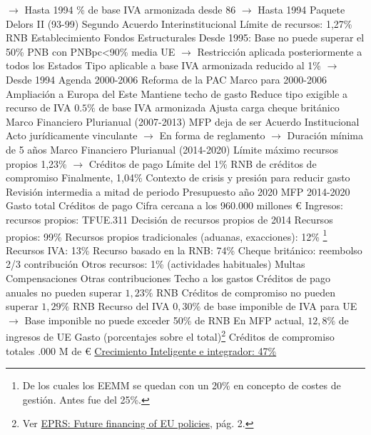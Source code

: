 \documentclass{nuevotema}
\begin{document}
\begin{esquemal}
				\4[] $\to$ Hasta 1994
				\% de base IVA armonizada  desde 86
				\4[] $\to$ Hasta 1994
			\3 Paquete Delors II (93-99)
				\4 Segundo Acuerdo Interinstitucional
				\4 Límite de recursos: 1,27\% RNB
				\4 Establecimiento Fondos Estructurales
				\4 Desde 1995:
				\4[] Base no puede superar el 50\% PNB con PNBpc<90\% media UE
				\4[] $\to$ Restricción aplicada posteriormente a todos los Estados
				\4[] Tipo aplicable a base IVA armonizada reducido al 1\%
				\4[] $\to$ Desde 1994
			\3 Agenda 2000-2006
				\4 Reforma de la PAC
				\4 Marco para 2000-2006
				\4 Ampliación a Europa del Este
				\4 Mantiene techo de gasto
				\4 Reduce tipo exigible a recurso de IVA
				\4[] $0.5\%$ de base IVA armonizada
				\4 Ajusta carga cheque británico
			\3 Marco Financiero Plurianual (2007-2013)
				\4 MFP deja de ser Acuerdo Institucional
				\4[] Acto jurídicamente vinculante
				\4[] $\to$ En forma de reglamento
				\4[] $\to$ Duración mínima de 5 años
			\3 Marco Financiero Plurianual (2014-2020)
				\4 Límite máximo recursos propios 1,23\%
				\4[] $\to$ Créditos de pago
				\4 Límite del 1\% RNB de créditos de compromiso
				\4[] Finalmente, 1,04\%
				\4 Contexto de crisis y presión para reducir gasto
				\4 Revisión intermedia a mitad de periodo
			\3 Presupuesto año 2020
		\2 MFP 2014-2020
			\3 Gasto total
				\4 Créditos de pago
				\4 Cifra cercana a los 960.000 millones €
			\3 Ingresos: recursos propios: TFUE.311
				\4 Decisión de recursos propios de 2014
				\4 Recursos propios: 99\%
				\4[] Recursos propios tradicionales (aduanas, exacciones): 12\% \footnote{De los cuales los EEMM se quedan con un 20\% en concepto de costes de gestión. Antes fue del 25\%.}
				\4[] Recursos IVA: 13\%
				\4[] Recurso basado en la RNB: 74\%
				\4[] Cheque británico: reembolso 2/3 contribución
				\4 Otros recursos: 1\% (actividades habituales)
				\4[] Multas
				\4[] Compensaciones
				\4[] Otras contribuciones
				\4 Techo a los gastos
				\4[] Créditos de pago anuales no pueden superar $1,23\%$ RNB
				\4[] Créditos de compromiso no pueden superar $1,29\%$ RNB
				\4 Recurso del IVA
				\4[] $0,30\%$ de base imponible de IVA para UE
				\4[] $\to$ Base imponible no puede exceder 50\% de RNB
				\4[] En MFP actual, $12,8\%$ de ingresos de UE
			\3 Gasto (porcentajes sobre el total)\footnote{Ver \href{https://www.europarl.europa.eu/RegData/etudes/BRIE/2019/635545/EPRS_BRI(2019)635545_EN.pdf}{EPRS: Future financing of EU policies}, pág. 2.}
				\4 Créditos de compromiso totales
				.000 M de €
				\4[1] \underline{Crecimiento Inteligente e integrador: 47\%}

\end{esquemal}
\end{document}
